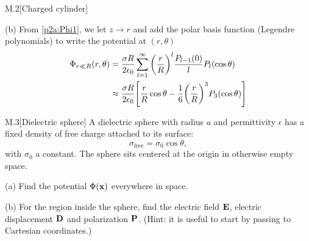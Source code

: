 \documentclass[12pt]{article}
\begin{document}
\begin{problem}{M.2}[Charged cylinder]
\begin{solution}
(b) From \eqref{p2a:Phi1}, we let $z\to r$ and add the polar basis function
(Legendre polynomials) to write the potential at $(r,\theta)$
\begin{align}
    \Phi_{r\ll R}(r,\theta)
    &=\frac{\sigma
    R}{2\epsilon_0}\sum_{l=1}^\infty\qty(\frac{r}{R})^{l}\frac{P_{l-1}(0)}{l}P_l(\cos\theta)\notag\\
    &\approx\frac{\sigma
    R}{2\epsilon_0}\qty[\frac{r}{R}\cos\theta-\frac16\qty(\frac{r}{R})^3P_3(\cos\theta)]
\end{align}
\end{solution}
\end{problem}
\newpage
\begin{problem}{M.3}[Dielectric sphere]
A dielectric sphere with radius $a$ and permittivity $\epsilon$ has a fixed
density of free charge attached to its surface:
\begin{equation}
    \sigma_{\text{free}}=\sigma_0\cos\theta, 
\end{equation}
with $\sigma_0$ a constant. The sphere sits centered at the origin in otherwise
empty space.

(a) Find the potential $\Phi(\vb{x})$ everywhere in space.

(b) For the region inside the sphere, find the electric field $\vb{E}$, electric
displacement $\vb{D}$ and polarization $\vb{P}$. (Hint: it is useful to start by
passing to Cartesian coordinates.)


\end{problem}
\end{document}
